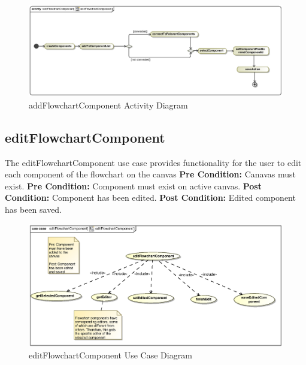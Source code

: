 \documentclass[12pt,a4paper,titlepage]{article}
\begin{document}
\begin{figure}[H]
  \centering
\includegraphics[width=500px]{addFlowchartComponentActivity.eps}
\caption{addFlowchartComponent Activity Diagram}
\end{figure}

\newpage
\subsection{editFlowchartComponent}

The editFlowchartComponent use case provides functionality for the user to edit each component of the flowchart on the canvas \newline\newline
\textbf{Pre Condition:} Canavas must exist.\newline
\textbf{Pre Condition:} Component must exist on active canvas.\newline\newline
\textbf{Post Condition:} Component has been edited.\newline
\textbf{Post Condition:} Edited component has been saved.

\begin{figure}[H]
  \centering
\includegraphics[width=500px]{editFlowchartComponent.eps}
\caption{editFlowchartComponent Use Case Diagram}
\end{figure}
\end{document}
